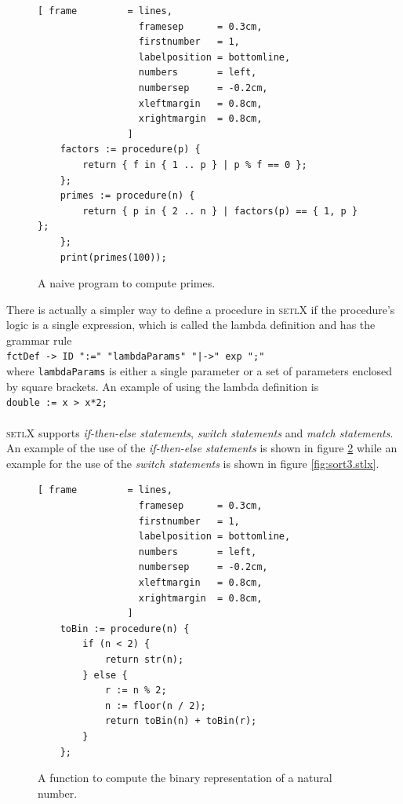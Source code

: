 \documentclass[11pt]{article}
\begin{document}
\begin{figure}[!ht]
\centering
\begin{Verbatim}[ frame         = lines, 
                  framesep      = 0.3cm, 
                  firstnumber   = 1,
                  labelposition = bottomline,
                  numbers       = left,
                  numbersep     = -0.2cm,
                  xleftmargin   = 0.8cm,
                  xrightmargin  = 0.8cm,
                ]
    factors := procedure(p) {
        return { f in { 1 .. p } | p % f == 0 };
    };
    primes := procedure(n) {
        return { p in { 2 .. n } | factors(p) == { 1, p } };
    };
    print(primes(100));
\end{Verbatim}
\vspace*{-0.3cm}
\caption{A naive program to compute primes.}
\label{fig:primes-slim.stlx}
\end{figure}

There is actually a simpler way to define a procedure in \textsc{setlX} if the procedure's logic is a single expression, which is called the lambda definition and has the grammar rule
\\[0.2cm]
\hspace*{1.3cm}
\texttt{fctDef -> ID ":=" "lambdaParams" "|->" exp ";"}
\\[0.2cm]
where \texttt{lambdaParams} is either a single parameter or a set of parameters enclosed by square brackets. An example of using the lambda definition is
\\[0.2cm]
\hspace*{1.3cm}
\texttt{double := x \-> x*2;}
\\[0.2cm]
\\

\textsc{setlX} supports \textsl{if-then-else statements}, \textsl{switch statements} and \textsl{match statements}. An example of the use of the \textsl{if-then-else statements} is shown in figure \ref{fig:toBin.stlx} while an example for the use of the \textsl{switch statements} is shown in figure \ref{fig:sort3.stlx}.

\begin{figure}[!ht]
\centering
\begin{Verbatim}[ frame         = lines, 
                  framesep      = 0.3cm, 
                  firstnumber   = 1,
                  labelposition = bottomline,
                  numbers       = left,
                  numbersep     = -0.2cm,
                  xleftmargin   = 0.8cm,
                  xrightmargin  = 0.8cm,
                ]
    toBin := procedure(n) {
        if (n < 2) {
            return str(n);
        } else {
            r := n % 2;
            n := floor(n / 2);
            return toBin(n) + toBin(r);
        }
    };
\end{Verbatim}
\vspace*{-0.3cm}
\caption{A function to compute the binary representation of a natural number.}
\label{fig:toBin.stlx}
\end{figure}
\end{document}
